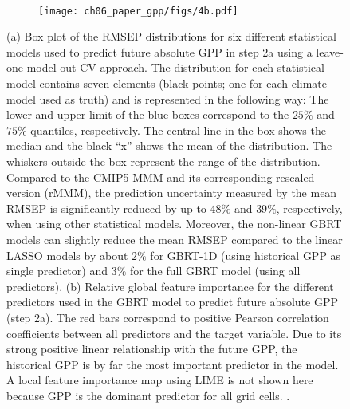 \begin{figure}[!t]
  \centering
  \begin{subfigure}[b]{\SubfigureWidth{}}
    \caption{}
    \label{fig:06:step2a_ml_inference:a}
  \end{subfigure}
  ~
  \begin{subfigure}[b]{\SubfigureWidth{}}
    \texttt{[image: ch06\_paper\_gpp/figs/4b.pdf]}
    \caption{}
    \label{fig:06:step2a_ml_inference:b}
  \end{subfigure}
  \caption[
    Prediction error in a leave-one-model-out \acl{CV} setup and feature
    importance of our \acl{ML} approach to constrain projected absolute
    \acf{GPP} at the end of the  century in step 2a.
  ]{
    (a) Box plot of the \acf{RMSEP} distributions for six different statistical
    models used to predict future absolute \acf{GPP} in step 2a using a
    leave-one-model-out \acl{CV} approach. The distribution for each
    statistical model contains seven elements (black points; one for each
    climate model used as truth) and is represented in the following way: The
    lower and upper limit of the blue boxes correspond to the $25 \unit{\%}$
    and $75 \unit{\%}$ quantiles, respectively. The central line in the box
    shows the median and the black \enquote{x} shows the mean of the
    distribution. The whiskers outside the box represent the range of the
    distribution. Compared to the \acs{CMIP}5 \acf{MMM} and its corresponding
    rescaled version (r\acs{MMM}), the prediction uncertainty measured by the
    mean \acs{RMSEP} is significantly reduced by up to $48 \unit{\%}$ and $39
    \unit{\%}$, respectively, when using other statistical models. Moreover,
    the non-linear \acf{GBRT} models can slightly reduce the mean \acs{RMSEP}
    compared to the linear \acf{LASSO} models by about $2 \unit{\%}$ for
    \acs{GBRT}-1D (using historical \acs{GPP} as single predictor) and $3
    \unit{\%}$ for the full \acs{GBRT} model (using all predictors). (b)
    Relative global feature importance for the different predictors used in the
    \acs{GBRT} model to predict future absolute \acs{GPP} (step 2a). The red
    bars correspond to positive Pearson correlation coefficients between all
    predictors and the target variable. Due to its strong positive linear
    relationship with the future \acs{GPP}, the historical \acs{GPP} is by far
    the most important predictor in the model. A local feature importance map
    using \acf{LIME} is not shown here because \acs{GPP} is the dominant
    predictor for all grid cells. .
  }
  \label{fig:06:step2a_ml_inference}
\end{figure}

